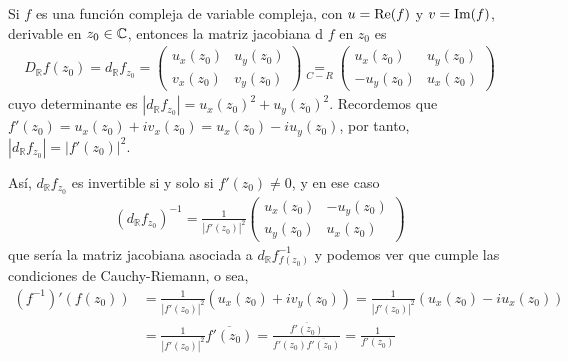 \begin{obs}
    Si $f$ es una función compleja de variable compleja, con $u = \text{Re}(f)$ y $v = \text{Im}(f)$, derivable en $z_0 \in \mathbb{C}$, entonces la matriz jacobiana d $f$ en $z_0$ es
    \begin{align*}
        D_{\mathbb{R}}f(z_0) = d_{\mathbb{R}}f_{z_0} = \begin{pmatrix}
                                                           u_x(z_0) & u_y(z_0) \\
                                                           v_x(z_0) & v_y(z_0)
                                                       \end{pmatrix} \underset{C-R}{=} \begin{pmatrix}
                                                                                           u_x(z_0)  & u_y(z_0) \\
                                                                                           -u_y(z_0) & u_x(z_0)
                                                                                       \end{pmatrix}
    \end{align*}
    cuyo determinante es $|d_{\mathbb{R}}f_{z_0}| = u_x(z_0)^2 + u_y(z_0)^2$. Recordemos que $f'(z_0) = u_x(z_0) + iv_x(z_0) = u_x(z_0) - iu_y(z_0)$, por tanto, $|d_{\mathbb{R}}f_{z_0}| = |f'(z_0)|^2$.

    Así, $d_{\mathbb{R}}f_{z_0}$ es invertible si y solo si $f'(z_0) \not = 0$, y en ese caso
    \begin{align*}
        (d_{\mathbb{R}}f_{z_0})^{-1} = \frac{1}{|f'(z_0)|^2}\begin{pmatrix}
                                                                u_x(z_0) & -u_y(z_0) \\
                                                                u_y(z_0) & u_x(z_0)
                                                            \end{pmatrix}
    \end{align*}
    que sería la matriz jacobiana asociada a $d_{\mathbb{R}}f^{-1}_{f(z_0)}$ y podemos ver que cumple las condiciones de Cauchy-Riemann, o sea,
    \begin{align*}
        \left(f^{-1}\right)'(f(z_0)) & = \frac{1}{|f'(z_0)|^2}(u_x(z_0) + iv_y(z_0))  = \frac{1}{|f'(z_0)|^2}(u_x(z_0) - iu_x(z_0))                         \\
                                     & = \frac{1}{|f'(z_0)|^2}\overline{f'(z_0)} = \frac{\overline{f'(z_0)}}{f'(z_0)\overline{f'(z_0)}} = \frac{1}{f'(z_0)}
    \end{align*}
\end{obs}

